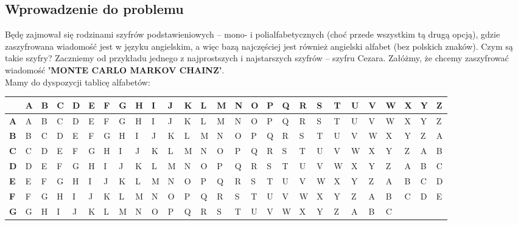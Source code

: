 \documentclass[a4paper]{article}
\theoremstyle{defn}
\theoremstyle{theorem}
\theoremstyle{lemma}
\theoremstyle{cor}
\theoremstyle{fact}
\begin{document}
\subsection{Wprowadzenie do problemu}
Będę zajmował się rodzinami szyfrów podstawieniowych – mono- i polialfabetycznych (choć przede wszystkim tą drugą opcją), gdzie zaszyfrowana wiadomość jest w języku angielskim, a więc bazą najczęściej jest również angielski alfabet (bez polskich znaków). Czym są takie szyfry? Zaczniemy od przykładu jednego z najprostszych i najstarszych szyfrów – szyfru Cezara. Załóżmy, że chcemy zaszyfrować wiadomość \textbf{'MONTE CARLO MARKOV CHAINZ'}.\\
Mamy do dyspozycji tablicę alfabetów:\\
\begin{center}
\begin{longtable}
{|p{1.5mm}|p{1.5mm}|p{1.5mm}|p{1.5mm}|p{1.5mm}|p{1.5mm}|p{1.5mm}|p{1.5mm}|p{1.5mm}|p{1.5mm}|p{1.5mm}|p{1.5mm}|p{1.5mm}|p{1.5mm}|p{1.5mm}|p{1.5mm}|p{1.5mm}|p{1.5mm}|p{1.5mm}|p{1.5mm}|p{1.5mm}|p{1.5mm}|p{1.5mm}|p{1.5mm}|p{1.5mm}|p{1.5mm}|p{1.5mm}|}
\hline
 & \textbf{A} & \textbf{B} & \textbf{C} & \textbf{D} & \textbf{E} & \textbf{F} & \textbf{G} & \textbf{H} & \textbf{I} & \textbf{J} & \textbf{K} & \textbf{L} & \textbf{M} & \textbf{N} & \textbf{O} & \textbf{P} & \textbf{Q} & \textbf{R} & \textbf{S} & \textbf{T} & \textbf{U} & \textbf{V} & 
\textbf{W} & \textbf{X} & \textbf{Y} & \textbf{Z} \\
\hline
\textbf{A} & A & B & C & D & E & F & G & H & I & J & K & L & M & N & O & P & Q & R & S & T & U & V & 
W & X & Y & Z
\\
\hline
\textbf{B} & B & C & D & E & F & G & H & I & J & K & L & M & N & O & P & Q & R & S & T & U & V & W & X
 & Y & Z & A
\\
\hline
\textbf{C} & C & D & E & F & G & H & I & J & K & L & M & N & O & P & Q & R & S & T & U & V & W & X & Y
 & Z & A & B
\\
\hline
\textbf{D} & D & E & F & G & H & I & J & K & L & M & N & O & P & Q & R & S & T & U & V & W & X & Y & Z
 & A & B & C
\\
\hline
\textbf{E} & E & F & G & H & I & J & K & L & M & N & O & P & Q & R & S & T & U & V & W & X & Y & Z & A
 & B & C & D
\\
\hline
\textbf{F} & F & G & H & I & J & K & L & M & N & O & P & Q & R & S & T & U & V & W & X & Y & Z & A & B
 & C & D & E
\\
\hline
\textbf{G} & G & H & I & J & K & L & M & N & O & P & Q & R & S & T & U & V & W & X & Y & Z & A & B & C

\end{longtable}
\end{center}
\end{document}
